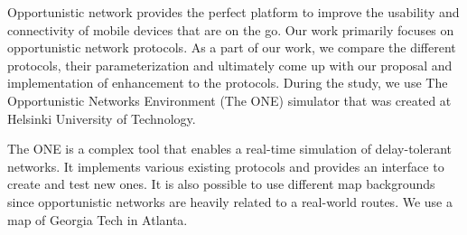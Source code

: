 \documentclass[conference]{IEEEtran}
\begin{document}
Opportunistic network provides the perfect platform to improve the usability and connectivity of mobile devices that are on the go. Our work primarily focuses on opportunistic network protocols. As a part of our work, we compare the different protocols, their parameterization and ultimately come up with our proposal and implementation of enhancement to the protocols. During the study, we use The Opportunistic Networks Environment (The ONE) simulator \cite{keranen-theone} that was created at Helsinki University of Technology.

The ONE is a complex tool that enables a real-time simulation of delay-tolerant networks. It implements various existing protocols and provides an interface to create and test new ones. It is also possible to use different map backgrounds since opportunistic networks are heavily related to a real-world routes. We use a map of Georgia Tech in Atlanta.

%
%


%
%
\end{document}
